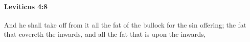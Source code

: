 
		\paragraph{Leviticus 4:8} %
			\label{LEVITICUS-4-8}

			And he shall take off from it all the fat of the bullock for the sin offering; the fat that covereth the inwards, and all the fat that is upon the inwards,


